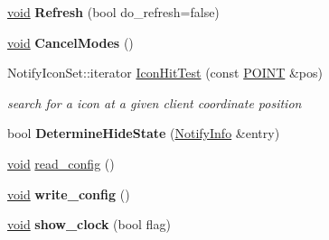 \begin{DoxyCompactItemize}
\hyperlink{interfacevoid}{void} {\bfseries Refresh} (bool do\+\_\+refresh=false)
\item 
\mbox{\label{struct_notify_area_a1da784c2a0675712c9443f48b875cd97}} 
\hyperlink{interfacevoid}{void} {\bfseries Cancel\+Modes} ()
\item 
\mbox{\label{struct_notify_area_a2d4bac72dd538cd553305f204b6922a6}} 
Notify\+Icon\+Set\+::iterator \hyperlink{struct_notify_area_a2d4bac72dd538cd553305f204b6922a6}{Icon\+Hit\+Test} (const \hyperlink{structtag_p_o_i_n_t}{P\+O\+I\+NT} \&pos)
\begin{DoxyCompactList}\small\item\em search for a icon at a given client coordinate position \end{DoxyCompactList}\item 
\mbox{\label{struct_notify_area_a0599c34e2ddbaf37e87cd830572783dd}} 
bool {\bfseries Determine\+Hide\+State} (\hyperlink{struct_notify_info}{Notify\+Info} \&entry)
\item 
\hyperlink{interfacevoid}{void} \hyperlink{struct_notify_area_a8971bf38f7f751fb5e428692ae98d7bd}{read\+\_\+config} ()
\item 
\mbox{\label{struct_notify_area_a80ca972c4d72905e7f443cf74719e040}} 
\hyperlink{interfacevoid}{void} {\bfseries write\+\_\+config} ()
\item 
\mbox{\label{struct_notify_area_a090f37e6fd18e30a0f45fba179c871e1}} 
\hyperlink{interfacevoid}{void} {\bfseries show\+\_\+clock} (bool flag)
\end{DoxyCompactItemize}
